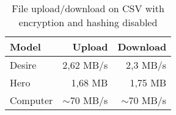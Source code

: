 \begin{table}
  \centering
  \caption{File upload/download on CSV with encryption and hashing disabled}
  \begin{tabular}{ | l | r | r |}
    \hline
    \textbf{Model}    &   \textbf{Upload}  &   \textbf{Download}   \\ \hline
    Desire & 2,62 MB/s & 2,3 MB/s \\ \hline
    Hero & 1,68 MB & 1,75 MB \\ \hline
    Computer & $\sim$70 MB/s & $\sim$70 MB/s \\ \hline
  \end{tabular}
  \label{tbl:files:unencrypted}
\end{table}
